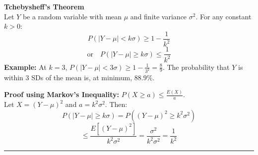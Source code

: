 \documentclass[10pt]{article}
\begin{document}
\hfill
\begin{minipage}[t]{0.26\textwidth}
\vspace{0pt} %
\textbf{\large Tchebysheff's Theorem}\\
Let $Y$ be a random variable with mean $\mu$ and finite variance $\sigma^2$. For any constant $k > 0$:
$$ P(|Y-\mu| < k\sigma) \ge 1 - \frac{1}{k^2} $$
$$ \text{or} \quad P(|Y-\mu| \ge k\sigma) \le \frac{1}{k^2} $$
\textbf{Example:} At $k=3$, $P(|Y-\mu| < 3\sigma) \ge 1 - \frac{1}{3^2} = \frac{8}{9}$. The probability that $Y$ is within 3 SDs of the mean is, at minimum, 88.9\%.

\vspace{1mm}
\textbf{Proof using Markov's Inequality:} $P(X \ge a) \le \frac{E(X)}{a}$.\\
Let $X = (Y-\mu)^2$ and $a = k^2\sigma^2$. Then:
$$ P(|Y-\mu| \ge k\sigma) = P((Y-\mu)^2 \ge k^2\sigma^2) $$
$$ \le \frac{E[(Y-\mu)^2]}{k^2\sigma^2} = \frac{\sigma^2}{k^2\sigma^2} = \frac{1}{k^2} $$
\end{minipage}

\vspace{4mm}
\hrule
\vspace{4mm}
\end{document}
